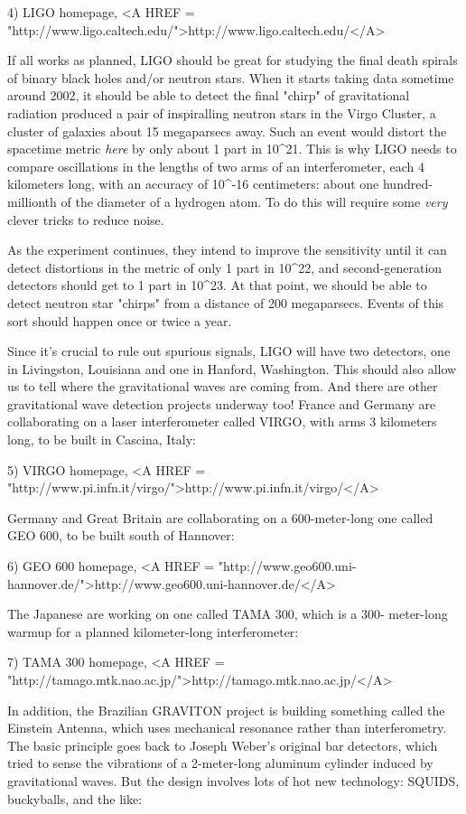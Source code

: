 4) LIGO homepage, <A HREF = "http://www.ligo.caltech.edu/">http://www.ligo.caltech.edu/</A>  

If all works as planned, LIGO should be great for studying the final 
death spirals of binary black holes and/or neutron stars.  When it 
starts taking data sometime around 2002, it should be able to detect 
the final "chirp" of gravitational radiation produced a pair of 
inspiralling neutron stars in the Virgo Cluster, a cluster of galaxies 
about 15 megaparsecs away.  Such an event would distort the spacetime 
metric \emph{here} by only about 1 part in 10^{21}.   This is why LIGO needs 
to compare oscillations in the lengths of two arms of an interferometer, 
each 4 kilometers long, with an accuracy of 10^{-16} centimeters: about 
one hundred-millionth of the diameter of a hydrogen atom.  To do this 
will require some \emph{very} clever tricks to reduce noise.  

As the experiment continues, they intend to improve the sensitivity 
until it can detect distortions in the metric of only 1 part in 10^{22},
and second-generation detectors should get to 1 part in 10^{23}.  At 
that point, we should be able to detect neutron star "chirps" from a
distance of 200 megaparsecs.  Events of this sort should happen once or 
twice a year.  

Since it's crucial to rule out spurious signals, LIGO will have two 
detectors, one in Livingston, Louisiana and one in Hanford, Washington.
This should also allow us to tell where the gravitational waves are
coming from.  And there are other gravitational wave detection projects 
underway too!  France and Germany are collaborating on a laser 
interferometer called VIRGO, with arms 3 kilometers long, to be built 
in Cascina, Italy:

5) VIRGO homepage, <A HREF = "http://www.pi.infn.it/virgo/">http://www.pi.infn.it/virgo/</A>

Germany and Great Britain are collaborating on a 600-meter-long
one called GEO 600, to be built south of Hannover:

6) GEO 600 homepage, <A HREF = "http://www.geo600.uni-hannover.de/">http://www.geo600.uni-hannover.de/</A>

The Japanese are working on one called TAMA 300, which is a 300-
meter-long warmup for a planned kilometer-long interferometer: 

7) TAMA 300 homepage, <A HREF = "http://tamago.mtk.nao.ac.jp/">http://tamago.mtk.nao.ac.jp/</A>

In addition, the Brazilian GRAVITON project is building something 
called the Einstein Antenna, which uses mechanical resonance rather
than interferometry.  The basic principle goes back to Joseph Weber's 
original bar detectors, which tried to sense the vibrations of a 
2-meter-long aluminum cylinder induced by gravitational waves.  But 
the design involves lots of hot new technology: SQUIDS, buckyballs, 
and the like:

